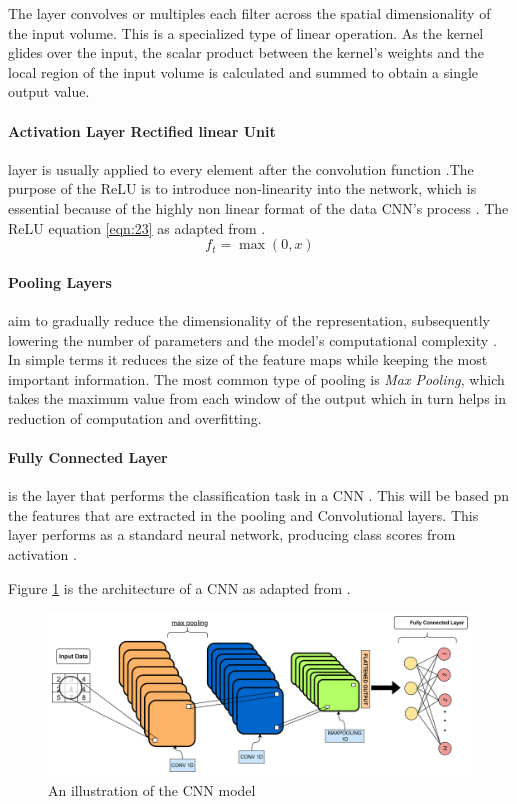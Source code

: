 The layer convolves or multiples each filter across the spatial dimensionality of the input volume. This is a specialized type of linear operation. As the kernel glides over the input, the scalar product  between the kernel's weights and the local region of the input volume is calculated and summed to obtain a single output value.

\paragraph{Activation Layer Rectified linear Unit} layer is usually applied to every element after the convolution function \cite{o2015introduction}.The purpose of the ReLU is to introduce non-linearity into the network, which is essential because of the highly non linear format of the data CNN's process \cite{wu2017introduction}. The ReLU equation \ref{eqn:23} as adapted from \cite{wu2017introduction}.
\[
f_t = \max (0,x)
\tag{23}
\label{eqn:23}
\]
\paragraph{Pooling Layers} aim to gradually reduce the dimensionality of the representation, subsequently lowering the number of parameters and the model's computational complexity \cite{li2021survey}. In simple terms it reduces the size of the feature maps while keeping the most important information. The most common type of pooling is \textit{Max Pooling}, which takes the maximum value from each window of the output  which in turn helps in reduction of computation and overfitting.

\paragraph{Fully Connected Layer} is the layer that performs the classification task in a CNN \cite{IBM_WhatAreCNNs_2025}. This will be based pn the features that are extracted in the pooling and Convolutional layers. This layer performs as a standard neural network, producing class scores from activation \cite{o2015introduction}.

Figure \ref{fig:cnn} is the architecture of a CNN as adapted from \cite{o2015introduction}.
\begin{figure}[h]
	\centering
	\includegraphics[width=0.7\linewidth]{Chapters/images/CNN}
	\caption{An illustration of the CNN model}
	\label{fig:cnn}
\end{figure}


